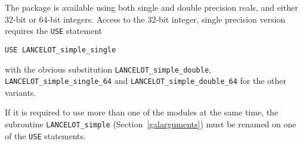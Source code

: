\documentclass{galahad}
\newcommand{\fullpackagename}{LANC\-E\-LOT\-\_simple}
\begin{document}
The package is available using both single and double precision reals, 
and either 32-bit or 64-bit integers. Access to the 32-bit integer,
single precision version requires the {\tt USE} statement
\medskip

\hspace{8mm} {\tt USE \fullpackagename\_single}

\medskip
\noindent
with the obvious substitution {\tt \fullpackagename\_double},
{\tt \fullpackagename\_single\_64} and 
{\tt \fullpackagename\_double\_64} for the other variants.

\noindent
If it is required to use more than one of the modules at the same time, 
the subroutine
{\tt \fullpackagename}
(Section~\ref{galarguments})
must be renamed on one of the {\tt USE} statements.





\galarguments
\end{document}
